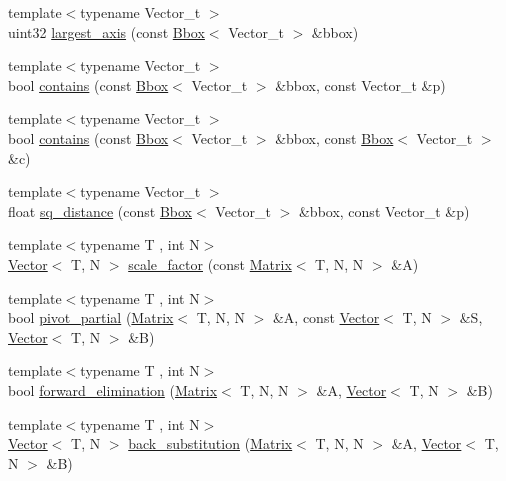 \begin{DoxyCompactItemize}
\item 
{\footnotesize template$<$typename Vector\+\_\+t $>$ }\\uint32 \hyperlink{group___bbox_module_ga45c74efdebfc6b9233fecb19aa268e45}{largest\+\_\+axis} (const \hyperlink{structcugar_1_1_bbox}{Bbox}$<$ Vector\+\_\+t $>$ \&bbox)
\item 
{\footnotesize template$<$typename Vector\+\_\+t $>$ }\\bool \hyperlink{group___bbox_module_ga997d14f97dd4c3c80e1896796170ea60}{contains} (const \hyperlink{structcugar_1_1_bbox}{Bbox}$<$ Vector\+\_\+t $>$ \&bbox, const Vector\+\_\+t \&p)
\item 
{\footnotesize template$<$typename Vector\+\_\+t $>$ }\\bool \hyperlink{group___bbox_module_gaeb563052dce95e32012796563ea7f611}{contains} (const \hyperlink{structcugar_1_1_bbox}{Bbox}$<$ Vector\+\_\+t $>$ \&bbox, const \hyperlink{structcugar_1_1_bbox}{Bbox}$<$ Vector\+\_\+t $>$ \&c)
\item 
{\footnotesize template$<$typename Vector\+\_\+t $>$ }\\float \hyperlink{group___bbox_module_ga771255b0f67e5f421e1cbb5b2fa367e0}{sq\+\_\+distance} (const \hyperlink{structcugar_1_1_bbox}{Bbox}$<$ Vector\+\_\+t $>$ \&bbox, const Vector\+\_\+t \&p)
\item 
{\footnotesize template$<$typename T , int N$>$ }\\\hyperlink{structcugar_1_1_vector}{Vector}$<$ T, N $>$ \hyperlink{group___matrices_module_ga342b4467e7b63d9df5aa3697d7fd8abf}{scale\+\_\+factor} (const \hyperlink{structcugar_1_1_matrix}{Matrix}$<$ T, N, N $>$ \&A)
\item 
{\footnotesize template$<$typename T , int N$>$ }\\bool \hyperlink{group___matrices_module_ga20543c9a7231a795cec130ea267f8407}{pivot\+\_\+partial} (\hyperlink{structcugar_1_1_matrix}{Matrix}$<$ T, N, N $>$ \&A, const \hyperlink{structcugar_1_1_vector}{Vector}$<$ T, N $>$ \&S, \hyperlink{structcugar_1_1_vector}{Vector}$<$ T, N $>$ \&B)
\item 
{\footnotesize template$<$typename T , int N$>$ }\\bool \hyperlink{group___matrices_module_ga779124249c080805739c3c6332bef28c}{forward\+\_\+elimination} (\hyperlink{structcugar_1_1_matrix}{Matrix}$<$ T, N, N $>$ \&A, \hyperlink{structcugar_1_1_vector}{Vector}$<$ T, N $>$ \&B)
\item 
{\footnotesize template$<$typename T , int N$>$ }\\\hyperlink{structcugar_1_1_vector}{Vector}$<$ T, N $>$ \hyperlink{group___matrices_module_ga280d2a0c34c9e17d89b638d5b71102f1}{back\+\_\+substitution} (\hyperlink{structcugar_1_1_matrix}{Matrix}$<$ T, N, N $>$ \&A, \hyperlink{structcugar_1_1_vector}{Vector}$<$ T, N $>$ \&B)

\end{DoxyCompactItemize}
